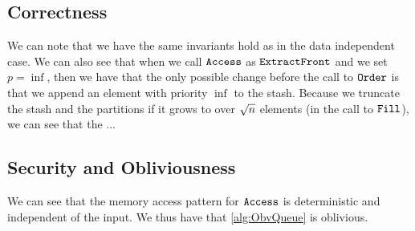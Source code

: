 \subsection{Correctness}
We can note that we have the same invariants hold as in the data independent case.
We can also see that when we call $\texttt{Access}$ as $\texttt{ExtractFront}$ and we set $p = \inf$,
then we have that the only possible change before the call to $\texttt{Order}$ is that we append an element with priority $\inf$ to the stash.
Because we truncate the stash and the partitions if it grows to over ${\sqrt{n}}$ elements (in the call to $\texttt{Fill}$),
we can see that the ...
\subsection{Security and Obliviousness}
We can see that the memory access pattern for $\texttt{Access}$ is deterministic and independent of the input.
We thus have that \cref{alg:ObvQueue} is oblivious.
	